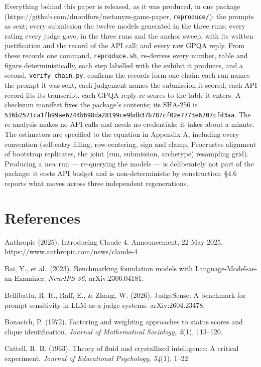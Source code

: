\documentclass{article}
\begin{document}
Everything behind this paper is released, as it was produced, in one package (https://github.com/dnordfors/metanym-game-paper, \texttt{reproduce/}): the prompts as sent; every submission the twelve models generated in the three runs; every rating every judge gave, in the three runs and the anchor sweep, with its written justification and the record of the API call; and every raw GPQA reply. From these records one command, \texttt{reproduce.sh}, re-derives every number, table and figure deterministically, each step labelled with the exhibit it produces, and a second, \texttt{verify\_\allowbreak{}chain.py}, confirms the records form one chain: each run names the prompt it was sent, each judgement names the submission it scored, each API record fits its transcript, each GPQA reply re-scores to the table it enters. A checksum manifest fixes the package's contents; its SHA-256 is \texttt{516b2571ca1fb99ae6744b698da28199ce9bdb37b787cf02e7773e6707cfd3aa}. The re-analysis makes no API calls and needs no credentials; it takes about a minute. The estimators are specified to the equation in Appendix A, including every convention (self-entry filling, row-centering, sign and clamp, Procrustes alignment of bootstrap replicates, the joint (run, submission, archetype) resampling grid). Producing a \emph{new} run --- re-querying the models --- is deliberately not part of the package: it costs API budget and is non-deterministic by construction; \S{}4.6 reports what moves across three independent regenerations.

\section*{References}
\begingroup\small\setlength{\parindent}{-1.5em}\setlength{\leftskip}{1.5em}

Anthropic (2025). Introducing Claude 4. Announcement, 22 May 2025. https://www.anthropic.com/news/claude-4

Bai, Y., et al.~(2023). Benchmarking foundation models with Language-Model-as-an-Examiner. \emph{NeurIPS 36.} arXiv:2306.04181.

Bellibatlu, R. R., Raff, E., \& Zhang, W. (2026). JudgeSense: A benchmark for prompt sensitivity in LLM-as-a-judge systems. arXiv:2604.23478.

Bonacich, P. (1972). Factoring and weighting approaches to status scores and clique identification. \emph{Journal of Mathematical Sociology, 2}(1), 113--120.

Cattell, R. B. (1963). Theory of fluid and crystallized intelligence: A critical experiment. \emph{Journal of Educational Psychology, 54}(1), 1--22.
\end{document}
